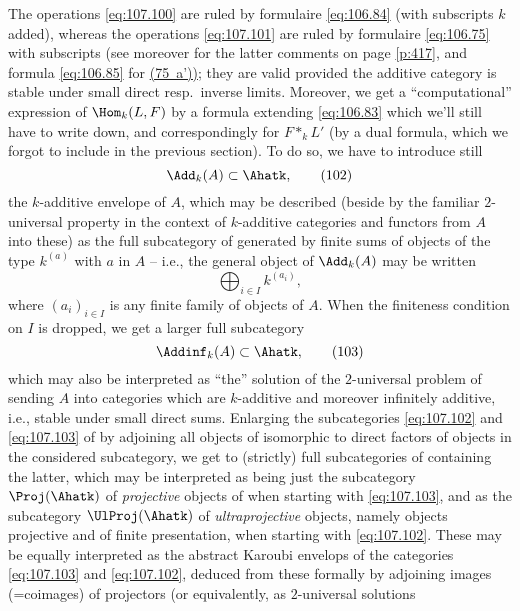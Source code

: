 The operations \eqref{eq:107.100} are ruled by formulaire
\eqref{eq:106.84} (with subscripts $k$ added), whereas the operations
\eqref{eq:107.101} are ruled by formulaire \eqref{eq:106.75} with
subscripts (see moreover for the latter comments on page \ref{p:417},
and formula \eqref{eq:106.85} for \hyperref[eq:106.75]{(75~a'))}; they
are valid provided the additive category is stable under small direct
resp.\ inverse limits. Moreover, we get a ``computational'' expression
of $\Hom_k(L,F)$ by a formula extending \eqref{eq:106.83} which we'll
still have to write down, and correspondingly for $F*_kL'$ (by a dual
formula, which we forgot to include in the previous section). To do
so, we have to introduce still
\begin{equation}
  \label{eq:107.102}
  \Add_k(A)\subset\Ahatk,\tag{102}
\end{equation}
the $k$-additive envelope of $A$, which may be described (beside by
the familiar $2$-universal property in the context of $k$-additive
categories and functors from $A$ into these) as the full subcategory
of \Ahatk{} generated by finite sums of objects of the type $k^{(a)}$
with $a$ in $A$ -- i.e., the general object of $\Add_k(A)$ may be
written
\[\bigoplus_{i\in I}k^{(a_i)},\]
where $(a_i)_{i\in I}$ is any finite family of objects of $A$. When
the finiteness condition on $I$ is dropped, we get a larger full
subcategory
\begin{equation}
  \label{eq:107.103}
  \Addinf_k(A)\subset\Ahatk,\tag{103}
\end{equation}
which may also be interpreted as ``the'' solution of the $2$-universal
problem of sending $A$ into categories which are $k$-additive and
moreover infinitely additive, i.e., stable under small direct
sums. Enlarging the subcategories \eqref{eq:107.102} and
\eqref{eq:107.103} of \Ahatk{} by adjoining all objects of
\Ahatk{} isomorphic to direct factors of objects in the
considered subcategory, we get to (strictly) full subcategories of
\Ahatk{} containing the latter, which may be interpreted as being just
the subcategory $\Proj(\Ahatk)$ of \emph{projective} objects of
\Ahatk{} when starting with \eqref{eq:107.103}, and as the subcategory
$\UlProj(\Ahatk)$ of \emph{ultraprojective} objects, namely objects
projective and of finite presentation, when starting with
\eqref{eq:107.102}. These may be equally interpreted as the abstract
Karoubi envelops of the categories \eqref{eq:107.103} and
\eqref{eq:107.102}, deduced from these formally by adjoining images
(=coimages) of projectors (or equivalently, as $2$-universal solutions
